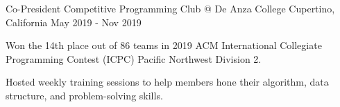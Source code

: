 \begin{cventries}
  \cventry
    {Co-President} %
    {Competitive Programming Club @ De Anza College} %
    {Cupertino, California} %
    {May 2019 - Nov 2019} %
    {
	\begin{cvitems} %
      	\item Won the 14th place out of 86 teams in 2019 ACM International Collegiate Programming Contest (ICPC) Pacific Northwest Division 2. 
      	\item Hosted weekly training sessions to help members hone their algorithm, data structure, and problem-solving skills. 
	\end{cvitems}
    }    
    

\end{cventries}
